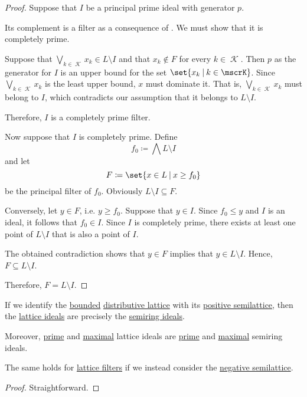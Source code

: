 \begin{proof}

  \SufficiencySubProof* Suppose that \( I \) be a principal prime ideal with generator \( p \).

  Its complement is a filter as a consequence of . We must show that it is completely prime.

  Suppose that \( \bigvee_{k \in \mscrK} x_k \in L \setminus I \) and that \( x_k \not\in F \) for every \( k \in \mscrK \). Then \( p \) as the generator for \( I \) is an upper bound for the set \( \set{ x_k \given k \in \mscrK } \). Since \( \bigvee_{k \in \mscrK} x_k \) is the least upper bound, \( x \) must dominate it. That is, \( \bigvee_{k \in \mscrK} x_k \) must belong to \( I \), which contradicts our assumption that it belongs to \( L \setminus I \).

  Therefore, \( I \) is a completely prime filter.

  \NecessitySubProof* Now suppose that \( I \) is completely prime. Define
  \begin{equation*}
    f_0 \coloneqq \bigwedge L \setminus I
  \end{equation*}
  and let
  \begin{equation*}
    F \coloneqq \set{ x \in L \given x \geq f_0 }
  \end{equation*}
  be the principal filter of \( f_0 \). Obviously \( L \setminus I \subseteq F \).

  Conversely, let \( y \in F \), i.e. \( y \geq f_0 \). Suppose that \( y \in I \). Since \( f_0 \leq y \) and \( I \) is an ideal, it follows that \( f_0 \in I \). Since \( I \) is completely prime, there exists at least one point of \( L \setminus I \) that is also a point of \( I \).

  The obtained contradiction shows that \( y \in F \) implies that \( y \in L \setminus I \). Hence, \( F \subseteq L \setminus I \).

  Therefore, \( F = L \setminus I \).
\end{proof}

\begin{proposition}\label{thm:semilattice_ideal_as_semiring_ideal}
  If we identify the \hyperref[def:semilattice/bounded]{bounded} \hyperref[def:semilattice/distributive_lattice]{distributive lattice} with its \hyperref[ex:def:semiring/lattice]{positive semilattice}, then the \hyperref[def:lattice_ideal/ideal]{lattice ideals} are precisely the \hyperref[def:semiring_ideal]{semiring ideals}.

  Moreover, \hyperref[def:lattice_ideal/prime]{prime} and \hyperref[def:lattice_ideal/maximal]{maximal} lattice ideals are \hyperref[def:semiring_ideal/prime]{prime} and \hyperref[def:semiring_ideal/maximal]{maximal} semiring ideals.

  The same holds for \hyperref[def:lattice_ideal/ideal]{lattice filters} if we instead consider the \hyperref[ex:def:semiring/lattice]{negative semilattice}.
\end{proposition}
\begin{proof}
  Straightforward.
\end{proof}


